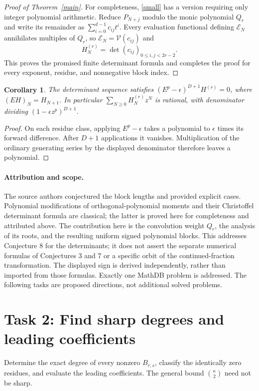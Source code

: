 \documentclass[10pt]{article}
\newtheorem{corollary}{Corollary}
\begin{document}
\begin{proof}[Proof of Theorem~\ref{main}]
For completeness, \eqref{small} has a version requiring only
integer polynomial arithmetic. Reduce $P_{N+j}$ modulo the monic
polynomial $Q_r$ and write its remainder as $\sum_{i=0}^{d-1}c_{ij}t^i$.
Every evaluation functional defining $\mathcal E_N$ annihilates
multiples of $Q_r$, so $\mathcal E_N=\mathcal V(c_{ij})$ and
\begin{equation}\label{integer}
 H_N^{(r)}=\det(c_{ij})_{0\le i,j<2r-2}.
\end{equation}
This proves the promised finite determinant formula and completes
the proof for every exponent, residue, and nonnegative block index.
\end{proof}

\begin{corollary}
The determinant sequence satisfies
$(E^p-\epsilon)^{D+1}H^{(r)}=0$, where $(EH)_N=H_{N+1}$.
In particular $\sum_{N\ge0}H_N^{(r)}z^N$ is rational, with
denominator dividing $(1-\epsilon z^p)^{D+1}$.
\end{corollary}
\begin{proof}
On each residue class, applying $E^p-\epsilon$ takes a polynomial
to $\epsilon$ times its forward difference. After $D+1$ applications
it vanishes. Multiplication of the ordinary generating series by
the displayed denominator therefore leaves a polynomial.
\end{proof}

\paragraph{Attribution and scope.}
The source authors conjectured the block lengths and provided
explicit cases. Polynomial modifications of orthogonal-polynomial
moments and their Christoffel determinant formula are classical;
the latter is proved here for completeness and attributed above.
The contribution here is the convolution weight $Q_r$, the analysis
of its roots, and the resulting uniform signed polynomial blocks.
This addresses Conjecture 8 for the determinants; it does not assert
the separate numerical formulas of Conjectures 3 and 7 or a specific
orbit of the continued-fraction transformation. The displayed sign
is derived independently, rather than imported from those formulas.
Exactly one MathDB problem is addressed. The following tasks are
proposed directions, not additional solved problems.

\section*{Task 2: Find sharp degrees and leading coefficients}
Determine the exact degree of every nonzero $B_{r,s}$, classify the
identically zero residues, and evaluate the leading coefficients.
The general bound $\binom\kappa2$ need not be sharp.
\end{document}
